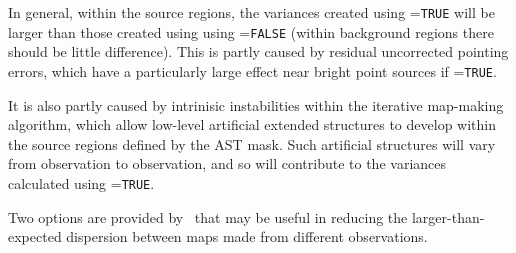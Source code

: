 In general, within the source regions, the variances created using
=\texttt{TRUE} will be larger than those created using
using =\texttt{FALSE} (within background regions there
should be little difference).  This is partly caused by residual
uncorrected pointing errors, which have a particularly large effect near
bright point sources if =\texttt{TRUE}.

It is also partly caused by intrinisic instabilities within the iterative
map-making algorithm, which allow low-level artificial extended structures
to develop within the source regions defined by the AST mask. Such
artificial structures will vary from observation to observation, and so
will contribute to the variances calculated using =\texttt{TRUE}.

Two options are provided by \poltwomap\ that may be useful in reducing
the larger-than-expected dispersion between maps made from different
observations.

